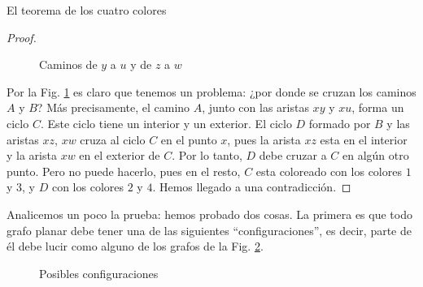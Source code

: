 \begin{section}{El teorema de los cuatro colores}
\begin{proof}
\begin{figure}[h]
    \begin{center}
    \end{center}
    \caption{Caminos de $y$ a $u$ y de $z$ a $w$} \label{fA4.12}
\end{figure}


Por la Fig. \ref{fA4.12} es claro que tenemos un problema: ¿por donde se cruzan los caminos $A$ y $ B$? Más precisamente, el camino $A$, junto con las aristas $xy$ y $xu$, forma un ciclo $C$. Este ciclo tiene un interior y un exterior. El ciclo $ D$ formado por $B$ y las aristas $xz$, $xw$ cruza al ciclo $C$ en el punto
$x$, pues la arista $xz$ esta en el interior y la arista $xw$ en el exterior de $C$. Por lo tanto, $D$ debe cruzar a $C$ en algún otro punto. Pero no puede hacerlo, pues en el resto, $C$ esta coloreado con los colores $1$ y $3$, y $D$ con los colores $2$ y $4$. Hemos llegado a una contradicción.
\end{proof}

Analicemos un poco la prueba: hemos probado dos cosas. La primera es que todo grafo planar debe tener una de las siguientes ``configuraciones'', es decir, parte de él debe lucir como alguno de los grafos de la Fig. \ref{fA4.13}.

\begin{figure}[h]
    \begin{center}
    \end{center}
\caption{Posibles configuraciones} \label{fA4.13}
\end{figure}


\end{section}
